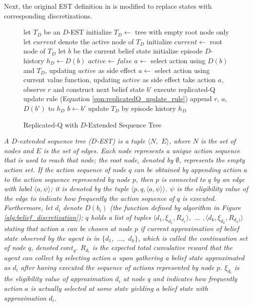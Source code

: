 \documentclass[10pt, conference, compsocconf]{IEEEtran}
\newenvironment{boxedalgorithmic}
  {\begin{lrbox}{\ieeealgbox}
   \begin{minipage}{\dimexpr\columnwidth-2\fboxsep-2\fboxrule}
   \begin{algorithmic}[1]}
  {\end{algorithmic}
   \end{minipage}
   \end{lrbox}\noindent\fbox{\usebox{\ieeealgbox}}}
\begin{document}
Next, the original EST definition in \cite{girgin_improving_2010} is modified to replace states with corresponding discretizations. 


\begin{figure}[t]
\begin{boxedalgorithmic}
\State let $T_D$ be an $D$-EST
\State initialize $T_D \leftarrow$ tree with empty root node only
\Repeat
	\State let $current$ denote the active node of $T_D$
	\State initialize $current \leftarrow$ root node of $T_D$
	\State let $b$ be the current belief state
	\State initialize episode $D$-history $h_D \leftarrow D(b)$
	\State $active \leftarrow false$
	\Repeat
			\State $a \leftarrow$ select action using $D(b)$ and $T_D$, updating $active$ as side effect
		\Else
			\State $a \leftarrow$ select action using current value function, updating $active$ as side effect
		\EndIf
		\State take action $a$, observe $r$ and construct next belief state $b'$
		\State execute replicated-Q update rule (Equation \ref{eqn:replicatedQ_update_rule})
		\State append $r$, $a$, $D(b')$ to $h_D$
		\State $b \leftarrow b'$
	\State update $T_D$ by episode history $h_D$
\EndProcedure
\end{boxedalgorithmic}
\caption{Replicated-Q with $D$-Extended Sequence Tree}
\label{alg:replicatedQtree}
\end{figure}



\begin{definition}
\label{def:new_extended_sequence_tree}
\textit{A \textit{$D$-extended sequence tree} ($D$-EST) is a tuple $\langle N,$ $E \rangle$, where $N$ is the set of nodes and $E$ is the set of edges. Each node represents a unique action sequence that is used to reach that node; the root node, denoted by $\emptyset$, represents the empty action set. If the action sequence of node $q$ can be obtained by appending action $a$ to the action sequence represented by node $p$, then $p$ is connected to $q$ by an edge with label $\langle a,\psi \rangle$; it is denoted by the tuple $\langle p, q, \langle a,\psi\rangle\rangle$. $\psi$ is the eligibility value of the edge to indicate how frequently the action sequence of $q$ is executed. Furthermore, let $d_i$ denote $D(b_i)$ (the function defined by algorithm in Figure \ref{alg:belief_discretization}); $q$ holds a list of tuples $\langle d_1,\xi_{d_1},R_{d_1}\rangle,$ $...$ $,\langle d_k,\xi_{d_k},R_{d_k)}\rangle$ stating that action $a$ can be chosen at node $p$ if current approximation of belief state observed by the agent is in $\lbrace d_1,$ $...,$ $d_k\rbrace$, which is called the continuation set of node $q$, denoted $cont_q$. $R_{d_i}$ is the expected total cumulative reward that the agent can collect by selecting action $a$  upon gathering a belief state approximated as $d_i$ after having executed the sequence of actions represented by node $p$. $\xi_{d_i}$ is the eligibility value of approximation $d_i$ at node $q$ and indicates how frequently action $a$ is actually selected at some state yielding a belief state with approximation $d_i$.}
\end{definition}
\end{document}
